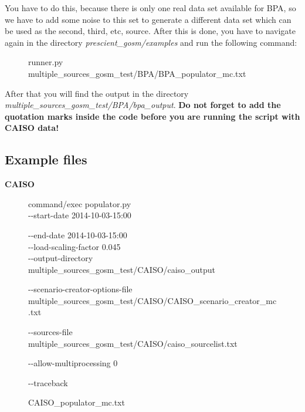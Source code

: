 You have to do this, because there is only one real data set available for BPA, so we have to add some noise to this set to generate a  different data set which can be used as the second, third, etc, source. After this is done, you have to navigate again in the directory \emph{prescient\_gosm/examples} and run the following command:\\

\begin{figure}[H]
	\begin{framed}
		runner.py multiple\_sources\_gosm\_test/BPA/BPA\_populator\_mc.txt
	\end{framed}
\end{figure}

After that you will find the output in the directory \emph{multiple\_sources\_gosm\_test/BPA/bpa\_output}.
\textbf{Do not forget to add the quotation marks inside the code before you are running the script with CAISO data!}

\clearpage

\subsection{Example files}

\textbf{CAISO}

\begin{figure}[H]
	\begin{framed}
		command/exec populator.py\\
		
		-{}-start-date 2014-10-03-15:00
		
		-{}-end-date 2014-10-03-15:00\\
		
		-{}-load-scaling-factor 0.045\\
		
		-{}-output-directory multiple\_sources\_gosm\_test/CAISO/caiso\_output
		
		-{}-scenario-creator-options-file multiple\_sources\_gosm\_test/CAISO/CAISO\_scenario\_creator\_mc.txt
		
		-{}-sources-file multiple\_sources\_gosm\_test/CAISO/caiso\_sourcelist.txt
		
		-{}-allow-multiprocessing 0
		
		-{}-traceback
	\end{framed}
	\caption{CAISO\_populator\_mc.txt}
\end{figure}

